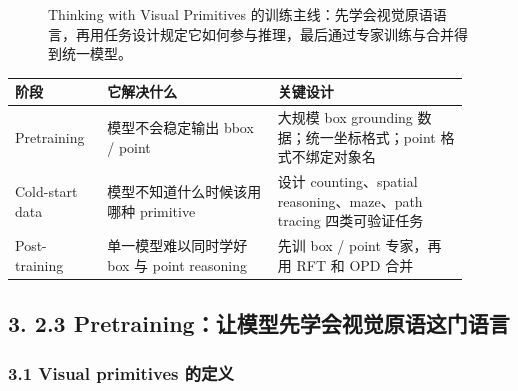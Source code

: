 \begin{figure}[H]
\centering
{}
\caption{Thinking with Visual Primitives 的训练主线：先学会视觉原语语言，再用任务设计规定它如何参与推理，最后通过专家训练与合并得到统一模型。}
\end{figure}

\begin{center}
\small
\setlength{\tabcolsep}{4pt}
\begin{tabular}{p{0.18\linewidth}p{0.34\linewidth}p{0.38\linewidth}}
\toprule
\textbf{阶段} & \textbf{它解决什么} & \textbf{关键设计} \\
\midrule
Pretraining & 模型不会稳定输出 bbox / point & 大规模 box grounding 数据；统一坐标格式；point 格式不绑定对象名 \\
Cold-start data & 模型不知道什么时候该用哪种 primitive & 设计 counting、spatial reasoning、maze、path tracing 四类可验证任务 \\
Post-training & 单一模型难以同时学好 box 与 point reasoning & 先训 box / point 专家，再用 RFT 和 OPD 合并 \\
\bottomrule
\end{tabular}
\end{center}

\subsection{3. 2.3 Pretraining：让模型先学会视觉原语这门语言}

\subsubsection{3.1 Visual primitives 的定义}

